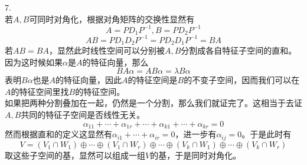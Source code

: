 \documentclass[utf8]{ctexart}
\begin{document}
7.\\
若$A,B$可同时对角化，根据对角矩阵的交换性显然有
\[A=PD_1P^{-1},B=PD_2P^{-1}\]
\[AB=PD_1D_2P^{-1}=PD_2D_1P^{-1}=BA\]
若$AB=BA$，显然此时线性空间可以分别被$A,B$分割成各自特征子空间的直和。因为这时候如果$\alpha$是$A$的特征向量，那么
\[BA\alpha=AB\alpha=\lambda B\alpha\]
表明$B\alpha$也是$A$的特征向量，因此$A$的特征空间是$B$的不变子空间，因而我们可以在$A$的特征空间里找$B$的特征空间。\\
如果把两种分割叠加在一起，仍然是一个分割，那么我们就证完了。这相当于去证$A,B$共同的特征子空间是否线性无关。
\[\alpha_{11}+\cdots+\alpha_{1r}+\cdots+\alpha_{k1}+\cdots+\alpha_{kr}=0\]
然而根据直和的定义这显然有$\alpha_{i1}+\cdots+\alpha_{ir}=0$，进一步有$\alpha_{ij}=0$。于是此时有
\[V=(V_1\cap W_1)\oplus\cdots\oplus(V_1\cap W_r)\oplus\cdots\oplus(V_k\cap W_1)\oplus\cdots\oplus(V_k\cap W_r)\]
取这些子空间的基，显然可以组成一组$V$的基，于是同时对角化。
\end{document}
